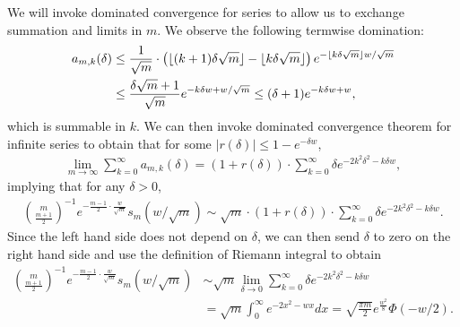 We will invoke dominated convergence for series to allow
us to exchange summation and limits in $m$.
We observe the following termwise domination:
\begin{align*}
  a_{m,k}(\delta) & \leq \frac{1}{\sqrt{m} } \cdot \left({\lfloor (k+1) \delta \sqrt{m}  \rfloor - \lfloor k \delta \sqrt{m} \rfloor }\right) e^{-\lfloor k \delta \sqrt{m} \rfloor w / \sqrt{m}} \\
  & \leq \frac{\delta \sqrt{m} + 1}{\sqrt{m}} e^{-k\delta w + w/\sqrt{m}} \nonumber
  \leq (\delta +1) e^{-k\delta w + w},
\end{align*}
which is summable in $k$.  We can then invoke dominated convergence theorem
for infinite series to obtain that for some $|r(\delta)| \leq 1 - e^{-\delta
  w}$,
\begin{align*}
  \lim_{m \to \infty} \sum_{k=0}^\infty a_{m,k}(\delta) = (1 + r(\delta)) \cdot \sum_{k=0}^\infty \delta e^{-2k^2 \delta^2 - k\delta w},
\end{align*}
implying that for any $\delta > 0$,
\begin{align*}
	\binom{m}{\frac{m+1}{2}}^{-1} e^{-\frac{m-1}{2} \cdot \frac{w}{\sqrt{m}}} s_m(w/\sqrt{m}) \sim \sqrt{m} \cdot (1 + r(\delta)) \cdot \sum_{k=0}^\infty \delta e^{-2k^2 \delta^2 - k\delta w}.
\end{align*}
Since the left hand side does not depend on $\delta$, we can then send $\delta$ to zero on the right hand side and use the definition of Riemann integral to obtain
\begin{align*}	
 	\binom{m}{\frac{m+1}{2}}^{-1} e^{-\frac{m-1}{2} \cdot \frac{w}{\sqrt{m}}} s_m(w/\sqrt{m}) 
	& \sim \sqrt{m} \lim_{\delta \to 0} \sum_{k=0}^\infty \delta e^{-2 k^2 \delta^2 - k\delta w } \nonumber \\
	& = \sqrt{m} \int_0^\infty e^{-2x^2 -wx} dx = \sqrt{\frac{ \pi m}{2}} e^{\frac{w^2}{8}} \Phi(-w/2).
\end{align*}
%
